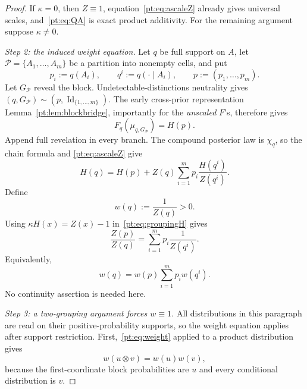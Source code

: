 \documentclass[11pt,a4paper]{article}
\theoremstyle{definition}
\newcommand{\Id}{\operatorname{Id}}
\newcommand{\1}{\mathbf 1}
\begin{document}
\begin{proof}
If $\kappa=0$, then $Z\equiv1$, equation~\eqref{pt:eq:ascaleZ} already gives universal scales, and~\eqref{pt:eq:QA} is exact
product additivity.  For the remaining argument suppose $\kappa\ne0$.

\emph{Step 2: the induced weight equation.}
Let $q$ be full support on $A$, let $\mathcal P=\{A_1,\ldots,A_m\}$ be a partition into nonempty cells, and put
\[
p_i:=q(A_i),
\qquad
q^i:=q(\cdot\mid A_i),
\qquad
p:=(p_1,\ldots,p_m).
\]
Let $G_{\mathcal P}$ reveal the block.  Undetectable-distinctions neutrality gives
$(q,G_{\mathcal P})\sim(p,\Id_{\{1,\ldots,m\}})$.  The early cross-prior representation
Lemma~\ref{pt:lem:blockbridge}, importantly for the \emph{unscaled} $F$'s, therefore gives
\begin{equation}
F_q(\mu_{q,G_{\mathcal P}})=H(p).
\tag{BG}\label{pt:eq:blockvalue}
\end{equation}
Append full revelation in every branch.  The compound posterior law is $\chi_q$, so the chain formula and
\eqref{pt:eq:ascaleZ} give
\begin{equation}
H(q)=H(p)+Z(q)\sum_{i=1}^m p_i\frac{H(q^i)}{Z(q^i)}.
\tag{GR}\label{pt:eq:groupingH}
\end{equation}
Define
\[
w(q):=\frac1{Z(q)}>0.
\]
Using $\kappa H(x)=Z(x)-1$ in~\eqref{pt:eq:groupingH} gives
\[
\frac{Z(p)}{Z(q)}=\sum_{i=1}^m p_i\frac1{Z(q^i)}.
\]
Equivalently,
\begin{equation}
w(q)=w(p)\sum_{i=1}^m p_iw(q^i).
\tag{W}\label{pt:eq:weight}
\end{equation}
No continuity assertion is needed here.

\emph{Step 3: a two-grouping argument forces $w\equiv1$.}
All distributions in this paragraph are read on their positive-probability supports, so the weight equation applies after
support restriction.  First,~\eqref{pt:eq:weight} applied to a product distribution gives
\begin{equation}
w(u\otimes v)=w(u)w(v),
\tag{M}\label{pt:eq:wmult}
\end{equation}
because the first-coordinate block probabilities are $u$ and every conditional distribution is $v$.


\end{proof}
\end{document}
